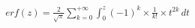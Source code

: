 \documentclass[preview]{standalone}
\begin{document}
\begin{align*}
erf(z) = { \frac{2}{\sqrt{\pi}} } \sum_{k=0}^{+\infty} \int_0^z { (-1)^k \times \frac{1}{k!} \times t^{2k} } \, dt
\end{align*}
\end{document}
